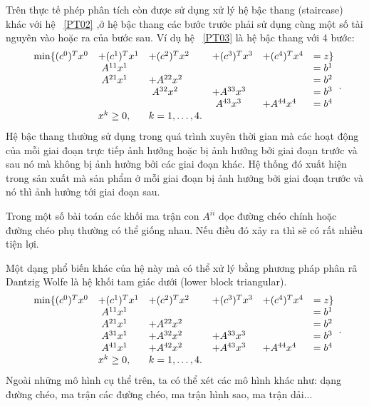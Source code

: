 Trên thực tế phép phân tích còn được sử dụng xử lý hệ bậc thang (staircase) khác với hệ ~\ref{PT02} ,ở hệ bậc thang các bước trước phải sử dụng cùng một số tài nguyên vào hoặc ra của bước sau. Ví dụ hệ ~\ref{PT03} là hệ bậc thang với 4 bước:
\begin{equation}\label{PT03}
 \begin{array}{llllll}
\min\{ (c^0)^Tx^0 &+ (c^1)^Tx^1 &+ (c^2)^Tx^2 &+ (c^3)^Tx^3 &+ (c^4)^T x^4 &= z\} \\
&\mbox{ }A^{11} x^1 & & & & = b^1\\
&\mbox{  }A^{21} x^1 &+A^{22} x^2 & & & = b^2\\
&&\mbox{  }A^{32} x^2 &+A^{33} x^3 & & = b^3\\
&& &\mbox{  }A^{43} x^3 &+A^{44} x^4 & = b^4\\
&x^k \geq 0, &k = 1, \ldots, 4.
\end{array}.
\end{equation}
Hệ bậc thang thường sử dụng trong quá trình xuyên thời gian mà các hoạt động của mỗi giai đoạn trực tiếp ảnh hưởng hoặc bị ảnh hưởng bởi giai đoạn trước và sau nó mà không bị ảnh hưởng bởi các giai đoạn khác. Hệ thống đó xuất hiện trong sản xuất mà sản phẩm ở mỗi giai đoạn bị ảnh hưởng bởi giai đoạn trước và nó thì ảnh hưởng tới giai đoạn sau.

Trong một số bài toán các khối ma trận con $A^{ii}$ dọc đường chéo chính hoặc đường chéo phụ thường có thể giống nhau. Nếu điều đó xảy ra thì sẽ có rất nhiều tiện lợi.

Một dạng phổ biến khác của hệ này mà có thể xử lý bằng phương pháp phân rã Dantzig Wolfe là hệ khối tam giác dưới  (lower block triangular).
\begin{equation}\label{PT04}
 \begin{array}{llllll}
\min \{(c^0)^Tx^0 &+ (c^1)^Tx^1 &+ (c^2)^Tx^2 &+ (c^3)^Tx^3 &+ (c^4)^T x^4 &= z\} \\
&\mbox{ }A^{11} x^1 & & & & = b^1\\
&\mbox{  }A^{21} x^1 &+A^{22} x^2 & & & = b^2\\
&\mbox{  }A^{31} x^1 &+A^{32} x^2 &+A^{33} x^3 & & = b^3\\
&\mbox{  }A^{41} x^1 &+A^{42} x^2 &+A^{43} x^3 &+A^{44} x^4 & = b^4\\
&x^k \geq 0, & k = 1, \ldots, 4.
\end{array} .
\end{equation}
Ngoài những mô hình cụ thể trên, ta có thể xét các mô hình khác như: dạng đường chéo, ma trận các đường chéo, ma trận hình sao, ma trận dải...
